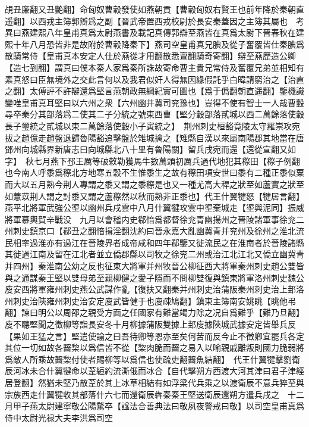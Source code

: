 覘丑廉翻又丑艷翻】命匈奴曹轂發使如燕朝貢【曹轂匈奴右賢王也前年降於秦朝直遥翻】以西戎主簿郭辯爲之副【晉武帝置西戎校尉於長安秦蓋因之主簿其屬也　考異曰燕建熙八年皇甫真爲太尉燕書及載記真傳郭辯至燕皆在真爲太尉下晉春秋在建熙十年八月恐皆非是故附於曹轂降秦下】燕司空皇甫真兄腆及從子奮覆皆仕秦腆爲散騎常侍【皇甫真本安定人仕於燕從才用翻散悉亶翻騎奇寄翻】辯至燕歷造公卿【造七到翻】謂真曰僕本秦人家爲秦所誅故寄命曹主貴兄常侍及奮覆兄弟並相知有素真怒曰臣無境外之交此言何以及我君似奸人得無因緣假託乎白暐請窮治之【治直之翻】太傅評不許辯還爲堅言燕朝政無綱紀實可圖也【爲于僞翻朝直遥翻】鑒機識變唯皇甫真耳堅曰以六州之衆【六州幽井冀司兖豫也】豈得不使有智士一人哉曹轂尋卒秦分其部落爲二使其二子分統之號東西曹【堅分轂部落貳城以西二萬餘落使轂長子璽統之貳城以東二萬餘落使轂小子寅統之】　荆州刺史桓豁竟陵太守羅崇攻宛拔之趙億走趙盤退歸魯陽豁追擊盤於雉城擒之【雉縣自漢以來屬南陽郡其地當在唐鄧州向城縣界新唐志曰向城縣北八十里有魯陽關】留兵戌宛而還【還從宣翻又如字】　秋七月燕下邳王厲等破敕勒獲馬牛數萬頭初厲兵過代地犯其穄田【穄子例翻也今南人呼黍爲穄北方地寒五穀不生惟黍生之故有穄田項安世曰黍有二種正黍似粟而大以五月熟今荆人專謂之黍又謂之黍穄是也又一種尤高大稈之狀至如蘆實之狀至如薏苡荆人謂之討黍又謂之蘆穄然以秋而熟非正黍也】代王什翼犍怒【犍居言翻】燕平北將軍武強公埿以幽州兵戌雲中八月什翼犍攻雲中埿棄城走【埿與泥同】振威將軍慕輿賀辛戰没　九月以會稽内史郗愔爲都督徐兖青幽揚州之晉陵諸軍事徐兖二州刺史鎮京口【郗丑之翻愔揖淫翻沈約曰晉永嘉大亂幽冀青并兖州及徐州之淮北流民相率過淮亦有過江在晉陵界者成帝咸和四年郗鑒又徙流民之在淮南者於晉陵諸縣其徙過江南及留在江北者並立僑郡縣以司牧之徐兖二州或治江北江北又僑立幽冀青并四州】秦淮南公幼之反也征東大將軍并州牧晉公柳征西大將軍秦州刺史趙公雙皆與之通謀秦王堅以雙母弟至親柳健之愛子隱而不問柳雙復與鎮東將軍洛州刺史魏公廋安西將軍雍州刺史燕公武謀作亂【復扶又翻秦并州刺史治蒲阪秦州刺史治上邽洛州刺史治陝雍州刺史治安定廋武皆健于也廋疎鳩翻】鎮東主簿南安姚眺【眺他弔翻】諫曰明公以周邵之親受方面之任國家有難當竭力除之况自爲難乎【難乃旦翻】廋不聽堅聞之徵柳等詣長安冬十月柳據蒲阪雙據上邽廋據陝城武據安定皆舉兵反【果如王猛之言】堅遣使諭之曰吾待卿等恩亦至矣何苦而反今止不徵卿宜罷兵各定其位一切如故各齧棃以爲信皆不從【棃肉脆而齧之易入以喻親戚離叛則國力脆弱將爲敵人所乘故齧棃付使者賜柳等以爲信也使疏吏翻齧魚結翻】　代王什翼犍擊劉衛辰河冰未合什翼犍命以葦絙約流澌俄而冰合【自代擊朔方西渡大河其津曰君子津經居登翻】然猶未堅乃散葦於其上冰草相結有如浮梁代兵乘之以渡衛辰不意兵猝至與宗族西走什翼犍收其部落什六七而還衛辰犇秦秦王堅送衛辰還朔方遣兵戌之　十二月甲子燕太尉建寧敬公陽騖卒【諡法合善典法曰敬夙夜警戒曰敬】以司空皇甫真爲侍中太尉光禄大夫李洪爲司空

